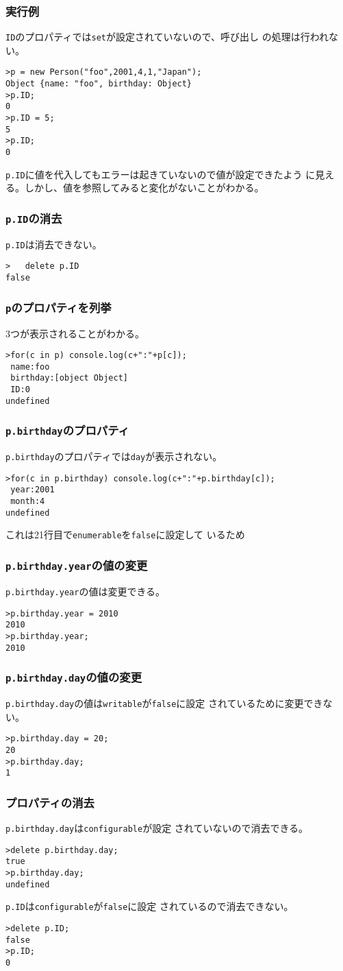 \begin{frame}[containsverbatim]
\frametitle{実行例}
 \texttt{ID}のプロパティでは\texttt{set}が設定されていないので、呼び出し
 の処理は行われない。
\begin{Verbatim}
>p = new Person("foo",2001,4,1,"Japan");
Object {name: "foo", birthday: Object}
>p.ID;
0
>p.ID = 5;
5
>p.ID;
0
\end{Verbatim}
\texttt{p.ID}に値を代入してもエラーは起きていないので値が設定できたよう
に見える。しかし、値を参照してみると変化がないことがわかる。
\end{frame}
\begin{frame}[containsverbatim]
\frametitle{\protect\texttt{p.ID}の消去}
 \texttt{p.ID}は消去できない。
\begin{Verbatim}
>	delete p.ID
false
\end{Verbatim}
\end{frame}
\begin{frame}[containsverbatim]
\frametitle{\protect\texttt{p}のプロパティを列挙}
3つが表示されることがわかる。
\begin{Verbatim}
>for(c in p) console.log(c+":"+p[c]);
 name:foo
 birthday:[object Object]
 ID:0
undefined
\end{Verbatim}
\end{frame}
\begin{frame}[containsverbatim]
\frametitle{\protect\texttt{p.birthday}のプロパティ}
\texttt{p.birthday}のプロパティでは\texttt{day}が表示されない。
\begin{Verbatim}
>for(c in p.birthday) console.log(c+":"+p.birthday[c]);
 year:2001
 month:4
undefined
\end{Verbatim}
これは21行目で\texttt{enumerable}を\texttt{false}に設定して
 いるため
\end{frame}
\begin{frame}[containsverbatim]
\frametitle{\protect\texttt{p.birthday.year}の値の変更}
\texttt{p.birthday.year}の値は変更できる。
\begin{Verbatim}
>p.birthday.year = 2010
2010
>p.birthday.year;
2010
\end{Verbatim}
\end{frame}
\begin{frame}[containsverbatim]
\frametitle{\protect\texttt{p.birthday.day}の値の変更}
\texttt{p.birthday.day}の値は\texttt{writable}が\texttt{false}に設定
されているために変更できない。
\begin{Verbatim}
>p.birthday.day = 20;
20
>p.birthday.day;
1
\end{Verbatim}
\end{frame}
\begin{frame}[containsverbatim]
\frametitle{プロパティの消去}
\texttt{p.birthday.day}は\texttt{configurable}が設定
されていないので消去できる。
\begin{Verbatim}
>delete p.birthday.day;
true
>p.birthday.day;
undefined
\end{Verbatim}
\texttt{p.ID}は\texttt{configurable}が\texttt{false}に設定
されているので消去できない。
\begin{Verbatim}
>delete p.ID;
false
>p.ID;
0
\end{Verbatim}
\end{frame}
